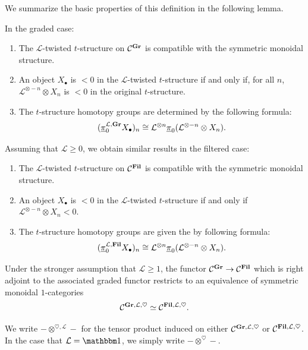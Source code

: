 We summarize the basic properties of this definition in the following lemma.

\begin{lem} \label{prop:twist-grade} \label{prop:twist-filt} \label{prop:twist-1-conn}
  In the graded case:
  \begin{enumerate}
  \item The $\mathcal{L}$-twisted $t$-structure on $\mathcal{C}^{\operatorname{\mathbf{Gr}}}$ is compatible with the symmetric monoidal structure.
  \item An object $X_\bullet$ is $< 0$ in the $\mathcal{L}$-twisted $t$-structure if and only if, for all $n$, $\mathcal{L}^{\otimes -n} \otimes X_n$ is $< 0$ in the original $t$-structure.
  \item The $t$-structure homotopy groups are determined by the following formula:
\[ (\underline{\pi}_0^{\mathcal{L}, \operatorname{\mathbf{Gr}}} X_\bullet )_n \cong \mathcal{L}^{\otimes n} \underline{\pi}_0(\mathcal{L}^{\otimes -n} \otimes X_n). \]
  \end{enumerate}
  Assuming that $\mathcal{L} \geq 0$, we obtain similar results in the filtered case:
  \begin{enumerate}
  \item[(1')] The $\mathcal{L}$-twisted $t$-structure on $\mathcal{C}^{\operatorname{\mathbf{Fil}}}$ is compatible with the symmetric monoidal structure.
  \item[(2')] An object $X_\bullet$ is $< 0$ in the $\mathcal{L}$-twisted $t$-structure if and only if $\mathcal{L}^{\otimes -n} \otimes X_n < 0$.
  \item[(3')] The $t$-structure homotopy groups are given the by following formula:
  \[ (\underline{\pi}_0^{\mathcal{L}, \operatorname{\mathbf{Fil}}} X_\bullet )_n \cong \mathcal{L}^{\otimes n} \underline{\pi}_0(\mathcal{L}^{\otimes -n} \otimes X_n). \]

  \end{enumerate}

  Under the stronger assumption that $\mathcal{L} \geq 1$, 
  the functor $\mathcal{C}^{\operatorname{\mathbf{Gr}}} \to \mathcal{C}^{\operatorname{\mathbf{Fil}}}$ which is right adjoint to the associated graded functor
  restricts to an equivalence of symmetric monoidal $1$-categories
  \[ \mathcal{C}^{\operatorname{\mathbf{Gr}}, \mathcal{L}, \heartsuit} \simeq \mathcal{C}^{\operatorname{\mathbf{Fil}}, \mathcal{L}, \heartsuit}. \]
\end{lem}

\begin{ntn}
  We write $- \otimes^{\heartsuit, \mathcal{L}} -$ for the tensor product induced on either $\mathcal{C}^{\operatorname{\mathbf{Gr}}, \mathcal{L}, \heartsuit}$ or $\mathcal{C}^{\operatorname{\mathbf{Fil}}, \mathcal{L}, \heartsuit}$. In the case that $\mathcal{L} = \o$, we simply write $- \otimes ^{\heartsuit} -$.
\end{ntn}

